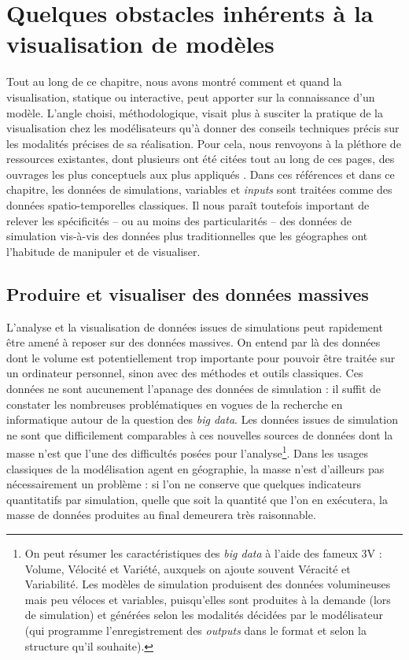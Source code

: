 \documentclass[a4paper, 12pt]{article}
\begin{document}
\section{Quelques obstacles inhérents à la visualisation de modèles}

Tout au long de ce chapitre, nous avons montré comment et quand la visualisation, statique ou interactive, peut apporter sur la connaissance d'un modèle.
L'angle choisi, méthodologique, visait plus à susciter la pratique de la visualisation chez les modélisateurs qu'à donner des conseils techniques précis sur les modalités précises de sa réalisation.
Pour cela, nous renvoyons à la pléthore de ressources existantes, dont plusieurs ont été citées tout au long de ces pages, des ouvrages les plus conceptuels \autocite{bertin1973semiologie,tukey_exploratory_1977,tufte_envisioning_1998,wilkinson_grammar_2006,keim_visual_2008} aux plus appliqués \autocite{kornhauser,ribecca2018data,wilke_fundamentals_2019}.
Dans ces références et dans ce chapitre, les données de simulations, variables et \textit{inputs} sont traitées comme des données spatio-temporelles classiques.
Il nous paraît toutefois important de relever les spécificités -- ou au moins des particularités -- des données de simulation vis-à-vis des données plus traditionnelles que les géographes ont l'habitude de manipuler et de visualiser.


	\subsection{Produire et visualiser des données massives}

L'analyse et la visualisation de données issues de simulations peut rapidement être amené à reposer sur des données \og massives\fg{}.
On entend par là des données dont le volume est potentiellement trop importante pour pouvoir être traitée sur un ordinateur personnel, sinon avec des méthodes et outils classiques.
Ces données ne sont aucunement l'apanage des données de simulation : il suffit de constater les nombreuses problématiques en vogues de la recherche en informatique autour de la question des \og \textit{big data}\fg{}.
Les données issues de simulation ne sont que difficilement comparables à ces nouvelles sources de données dont la masse n'est que l'une des difficultés posées pour l'analyse\footnote{
On peut résumer les caractéristiques des \og \textit{big data}\fg{} à l'aide des fameux \og 3V\fg{} : Volume, Vélocité et Variété, auxquels on ajoute souvent Véracité et Variabilité.
Les modèles de simulation produisent des données volumineuses mais peu véloces et variables, puisqu'elles sont produites à la demande (lors de simulation) et générées selon les modalités décidées par le modélisateur (qui programme l'enregistrement des \textit{outputs} dans le format et selon la structure qu'il souhaite).
}.
Dans les usages classiques de la modélisation agent en géographie, la masse n'est d'ailleurs pas nécessairement un problème : si l'on ne conserve que quelques indicateurs quantitatifs par simulation, quelle que soit la quantité que l'on en exécutera, la masse de données produites au final demeurera très raisonnable.
\end{document}
